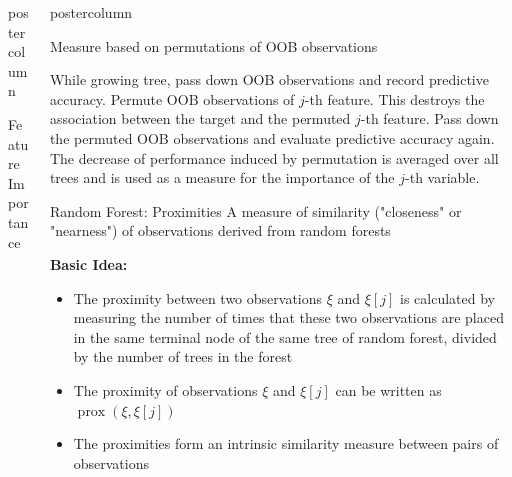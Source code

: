 \documentclass{beamer}
\begin{document}
\begin{frame}[fragile]{}
\begin{columns}
\begin{column}{.31\textwidth}
\begin{beamercolorbox}[center]{postercolumn}
\begin{minipage}{.98\textwidth}
{\begin{myblock}{Feature Importance}
  
  \end{myblock}
}
\end{minipage}
\end{beamercolorbox}
\end{column}


\begin{column}{.31\textwidth}
\begin{beamercolorbox}[center]{postercolumn}
\begin{minipage}{.98\textwidth}
\parbox[t][\columnheight]{\textwidth}{
  \begin{myblock}{ }
  \begin{algorithm}[H]
  \small
  \caption{Measure based on permutations of OOB observations}
  \begin{algorithmic}[0]
  \State While growing tree, pass down OOB observations and record predictive accuracy.
  \State Permute OOB observations of $j$-th feature. This destroys the association between the target and the permuted $j$-th feature.
  \State Pass down the permuted OOB observations and evaluate predictive accuracy again.
  \State The decrease of performance induced by permutation is averaged over all trees and is used as a measure for the importance of the $j$-th variable.
  \end{algorithmic}
  \end{algorithm}
  
  \end{myblock}
  \begin{myblock}{Random Forest: Proximities}
  A measure of similarity ("closeness" or "nearness") of observations derived from random forests
  
  \begin{codebox} 
  \textbf{Basic Idea: }	
  \end{codebox}
  
  
  \begin{itemize}[$\bullet$]     
  \setlength{\itemindent}{+.3in}
  \item The proximity between two observations $\xi$ and $\xi[j]$ is calculated by measuring the number of times that these two observations are placed in the same terminal node of the same tree of random forest, divided by the number of trees in the forest
  \item The proximity of observations $\xi$ and $\xi[j]$ can be written as $\operatorname{prox}\left(\xi, \xi[j]\right)$
    \item The proximities form an intrinsic similarity measure between pairs of observations
  \end{itemize}
  

\end{myblock}}
\end{minipage}
\end{beamercolorbox}
\end{column}
\end{columns}
\end{frame}
\end{document}
